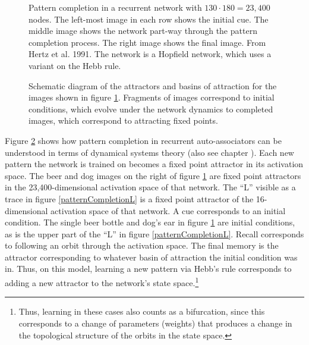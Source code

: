 \begin{figure}[h]
\centering
{}
\caption[From Hertz, Krogh, and Palmer, 1991 \cite{hertz1991introduction}.]{Pattern completion in a recurrent network with $130 \cdot 180 = 23,400$ nodes. The left-most image in each row shows the initial cue. The middle image shows the network part-way through the pattern completion process. The right image shows the final image. From Hertz et al. 1991. The network is a Hopfield network, which uses a variant on the Hebb rule.}
\label{patternCompletionBeerDog}
\end{figure}


\begin{figure}[h]
\centering
{}
\caption[Pamela Payne, using elements from Hertz, Krogh, and Palmer, 1991 \cite{hertz1991introduction}.]{Schematic diagram of the attractors and basins of attraction for the images shown in figure \ref{patternCompletionBeerDog}. Fragments of images correspond to initial conditions, which evolve under the network dynamics to completed images, which correspond to attracting fixed points.}
\label{beerDogAttractors}
\end{figure}

Figure \ref{beerDogAttractors} shows how pattern completion in recurrent auto-associators can be understood in terms of dynamical systems theory (also see chapter ). Each new pattern the network is trained on becomes a fixed point attractor in its activation space. The beer and dog images on the right of figure \ref{patternCompletionBeerDog} are fixed point attractors in the 23,400-dimensional activation space of that network. The ``L'' visible as a trace in figure \ref{patternCompletionL} is a fixed point attractor of the 16-dimensional activation space of that network. A cue corresponds to an initial condition. The single beer bottle and dog's ear in figure \ref{patternCompletionBeerDog} are initial conditions, as is the upper part of the ``L'' in figure \ref{patternCompletionL}. Recall corresponds to following an orbit through the activation space. The final memory is the attractor corresponding to whatever basin of attraction the initial condition was in. Thus, on this model, learning a new pattern via Hebb's rule corresponds to adding a new attractor to the network's state space.\footnote{Thus, learning in these cases also counts as a bifurcation, since this corresponds to a change of parameters (weights) that produces a change in the topological structure of the orbits in the state space.}

